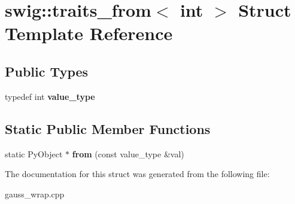 \hypertarget{structswig_1_1traits__from_3_01int_01_4}{\section{swig\-:\-:traits\-\_\-from$<$ int $>$ Struct Template Reference}
\label{structswig_1_1traits__from_3_01int_01_4}
}
\subsection*{Public Types}
\begin{DoxyCompactItemize}
\item 
\hypertarget{structswig_1_1traits__from_3_01int_01_4_a8ef50f55ced531913a4fc257341f0a91}{typedef int {\bfseries value\-\_\-type}}\label{structswig_1_1traits__from_3_01int_01_4_a8ef50f55ced531913a4fc257341f0a91}

\end{DoxyCompactItemize}
\subsection*{Static Public Member Functions}
\begin{DoxyCompactItemize}
\item 
\hypertarget{structswig_1_1traits__from_3_01int_01_4_a4db26c74c33211bc2edbb0a65061a96f}{static Py\-Object $\ast$ {\bfseries from} (const value\-\_\-type \&val)}\label{structswig_1_1traits__from_3_01int_01_4_a4db26c74c33211bc2edbb0a65061a96f}

\end{DoxyCompactItemize}


The documentation for this struct was generated from the following file\-:\begin{DoxyCompactItemize}
\item 
gauss\-\_\-wrap.\-cpp\end{DoxyCompactItemize}
